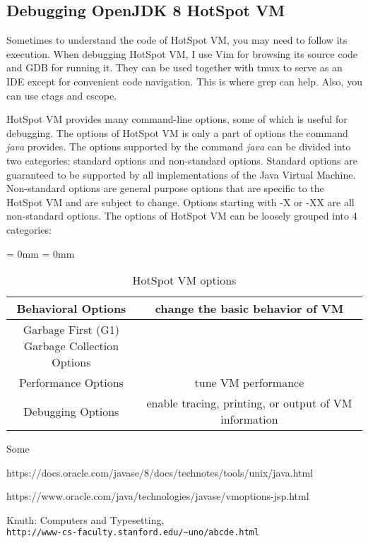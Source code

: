 \documentclass[UTF8]{ctexart}
\begin{document}
\begin{appendices}
\section{\color{blue}Debugging OpenJDK 8 HotSpot VM}
\par
Sometimes to understand the code of HotSpot VM, you may need to follow its execution. When debugging HotSpot VM, I use Vim for browsing its source code and GDB for running it. They can be used together with tmux to serve as an IDE except for convenient code navigation. This is where grep can help. Also, you can use ctags and cscope.
\par
HotSpot VM provides many command-line options, some of which is useful for debugging. The options of HotSpot VM is only a part of options the command \textit{java} provides. The options supported by the command \textit{java} can be divided into two categories: standard options and non-standard options. Standard options are guaranteed to be supported by all implementations of the Java Virtual Machine. Non-standard options are general purpose options that are specific to the HotSpot VM and are subject to change. Options starting with -X or -XX are all non-standard options.\cite{java_command} The options of HotSpot VM can be loosely grouped into 4 categories:\cite{hotspot_options}
\begin{table}[h!]
\caption{HotSpot VM options}
\begin{center}
\aboverulesep = 0mm
\belowrulesep = 0mm
\begin{tabular}{c|c}
\toprule
\hline
Behavioral Options & change the basic behavior of VM \\ \hline
\makecell{Garbage First (G1) \\ Garbage Collection Options} & \\ \hline
Performance Options & tune VM performance \\ \hline
Debugging Options & enable tracing, printing, or output of VM information \\ \hline
\bottomrule
\hline
\end{tabular}
\end{center}
\end{table}
\par
Some

\end{appendices}


\newpage
\begin{thebibliography}{9}
https://docs.oracle.com/javase/8/docs/technotes/tools/unix/java.html

https://www.oracle.com/java/technologies/javase/vmoptions-jsp.html

Knuth: Computers and Typesetting,
\\\texttt{http://www-cs-faculty.stanford.edu/\~{}uno/abcde.html}
\end{thebibliography}
\end{document}
